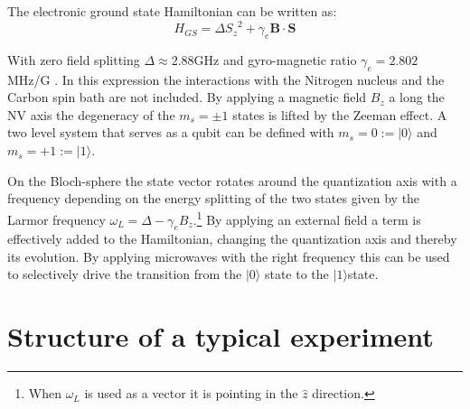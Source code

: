 The electronic ground state Hamiltonian can be written as\citep{Pfaff2013Quantum}: 
 \begin{equation}
H_{GS} = \Delta {S_z}^2 + \gamma_e \mathbf{B} \cdot \mathbf{S}
\end{equation}

With zero field splitting $\Delta \approx 2.88 \mathrm{GHz}$  and gyro-magnetic ratio $\gamma_e  = 2.802$ MHz/G . In this expression the interactions with the Nitrogen nucleus and the Carbon spin bath are not included. By applying a magnetic field $B_z$ a long the NV axis the degeneracy of the  $m_s =\pm1$ states is lifted by the Zeeman effect. A two level system that serves as a qubit can be defined with  $m_s=0:=|0\rangle$ and $m_s = +1 := |1\rangle$.

On the Bloch-sphere the state vector rotates around the quantization axis with a frequency depending on the energy splitting of the two states given by the Larmor frequency  $\omega_L =\Delta - \gamma_e {B_z} $.\footnote{When  $\omega_L$  is used as a vector it is pointing in the $\hat{z}$ direction.} By applying an external field a term is effectively added to the Hamiltonian, changing the quantization axis and thereby its evolution. By applying microwaves with the right frequency this can be used to selectively drive the transition from the  $|0\rangle$ state to the $|1\rangle$state\citet{Jelezko2004Observation}.


\section{Structure of a typical experiment}




